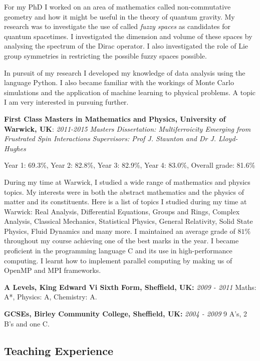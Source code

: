 \documentclass[a4paper,12pt]{article}
\begin{document}
For my PhD I worked on an area of mathematics called non-commutative
geometry and how it might be useful in the theory of quantum gravity. My
research was to investigate the use of called \emph{fuzzy spaces} as
candidates for quantum spacetimes. I investigated the dimension and
volume of these spaces by analysing the spectrum of the Dirac operator.
I also investigated the role of Lie group symmetries in restricting the
possible fuzzy spaces possible.

In pursuit of my research I developed my knowledge of data analysis
using the language Python. I also became familiar with the workings of
Monte Carlo simulations and the application of machine learning to
physical problems. A topic I am very interested in pursuing further.

\textbf{First Class Masters in Mathematics and Physics, University of
Warwick, UK}: {\emph{2011-2015}} \emph{Masters Dissertation:
Multiferroicity Emerging from Frustrated Spin Interactions}
\emph{Supervisors: Prof J. Staunton and Dr J. Lloyd-Hughes}

Year 1: 69.3\%, Year 2: 82.8\%, Year 3: 82.9\%, Year 4: 83.0\%, Overall
grade: 81.6\%

During my time at Warwick, I studied a wide range of mathematics and
physics topics. My interests were in both the abstract mathematics and
the physics of matter and its constituents. Here is a list of topics I
studied during my time at Warwick: Real Analysis, Differential
Equations, Groups and Rings, Complex Analysis, Classical Mechanics,
Statistical Physics, General Relativity, Solid State Physics, Fluid
Dynamics and many more. I maintained an average grade of \(81\%\)
throughout my course achieving one of the best marks in the year. I
became proficient in the programming language C and its use in
high-performance computing. I learnt how to implement parallel computing
by making us of OpenMP and MPI frameworks.

\textbf{A Levels, King Edward Vi Sixth Form, Sheffield, UK:} {
\emph{2009 - 2011} }Maths: A*, Physics: A, Chemistry: A.

\textbf{GCSEs, Birley Community College, Sheffield, UK:} { \emph{2004 -
2009} } 9 A's, 2 B's and one C.

\hypertarget{teaching-experience}{%
\subsection{Teaching Experience}\label{teaching-experience}}
\end{document}
